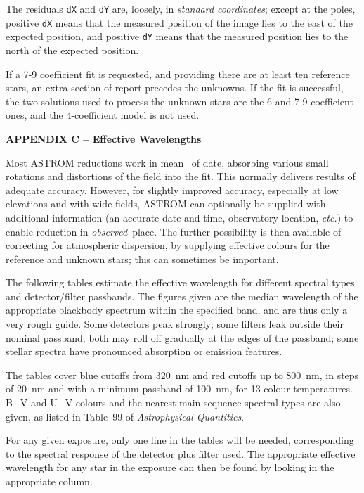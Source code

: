 \vspace{20mm}

The residuals \verb|dX| and \verb|dY| are, loosely, in
{\it standard coordinates}; except at the poles,
positive \verb|dX| means
that the measured position of the image lies to the east of the
expected position, and positive \verb|dY| means that the measured position
lies to the north of the expected position.

If a 7-9 coefficient fit is requested, and providing there are at
least ten reference stars, an extra section of report precedes the
unknowns.  If the fit is successful, the two solutions used to process
the unknown stars are the 6 and 7-9 coefficient ones, and the
4-coefficient model is not used.

\pagebreak
{\bf APPENDIX C -- Effective Wavelengths}
\vspace{5mm}

Most ASTROM reductions work in mean \radec\ of date, absorbing
various small rotations and distortions of the field into the
fit.  This normally delivers results of adequate accuracy.
However, for slightly improved accuracy, especially at low
elevations and with wide fields, ASTROM can optionally be supplied with
additional information (an accurate date and time,
observatory location, {\it etc.}) to enable reduction in
{\it observed}\, place.  The further possibility is then
available of correcting for atmospheric dispersion, by
supplying effective colours for the reference and unknown stars;
this can sometimes be important.

The following tables estimate the effective wavelength for different
spectral types and detector/filter passbands.  The figures given are the
median wavelength of the appropriate blackbody spectrum within the
specified band, and are thus only a very rough guide.  Some detectors
peak strongly; some filters leak outside their nominal
passband; both may roll off gradually at the edges of the passband;
some stellar spectra have pronounced absorption or emission
features.

The tables cover blue cutoffs from 320~nm and red cutoffs up to 800~nm,
in steps of 20~nm and with a minimum passband of 100~nm, for 13
colour temperatures.  B$-$V and U$-$V colours and
the nearest main-sequence spectral types are also given, as listed
in Table~99 of {\it Astrophysical Quantities}.

For any given exposure, only one line in the tables will be
needed, corresponding to the spectral response of the detector plus
filter used.  The appropriate effective wavelength for any star in
the exposure can then be found by looking in the appropriate
column.


